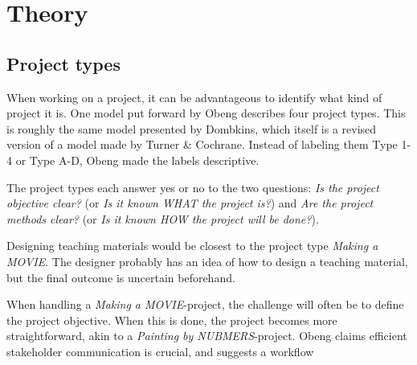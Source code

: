 \chapter{Theory}

\section{Project types}
When working on a project, it can be advantageous to identify what kind of project it is. One model put forward by Obeng describes four project types. This is roughly the same model presented by Dombkins, which itself is a revised version of a model made by Turner \& Cochrane. Instead of labeling them Type 1-4 or Type A-D, Obeng made the labels descriptive.

The project types each answer yes or no to the two questions: \textit{Is the project objective clear?} (or \textit{Is it known WHAT the project is?}) and \textit{Are the project methods clear?} (or \textit{Is it known HOW the project will be done?}).

\begin{table}
\caption{Turner \& Cochrane, Dombkins and Obeng described the same type of project differently.}
\end{table}

Designing teaching materials would be closest to the project type \textit{Making a MOVIE}. The designer probably has an idea of how to design a teaching material, but the final outcome is uncertain beforehand.

When handling a \textit{Making a MOVIE}-project, the challenge will often be to define the project objective. When this is done, the project becomes more straightforward, akin to a \textit{Painting by NUBMERS}-project.
Obeng claims efficient stakeholder communication is crucial, and suggests a workflow 

